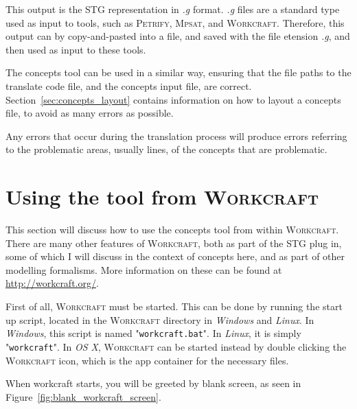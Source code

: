 \documentclass{proc}
\newcommand{\noun}[1]{\textsc{#1}}
\begin{document}
This output is the STG representation in \emph{.g} format. \emph{.g} files are a standard type used as input to tools, such as \noun{Petrify}, \noun{Mpsat}, and \noun{Workcraft}. 
Therefore, this output can by copy-and-pasted into a file, and saved with the file etension \emph{.g}, and then used as input to these tools. 

The concepts tool can be used in a similar way, ensuring that the file paths to the translate code file, and the concepts input file, are correct. Section~\ref{sec:concepts_layout} contains 
information on how to layout a concepts file, to avoid as many errors as possible. 

Any errors that occur during the translation process will produce errors referring to the problematic areas, usually lines, of the concepts that are problematic. 

\section{Using the tool from \noun{Workcraft} \label{sec:workcraft_usage}}

This section will discuss how to use the concepts tool from within \noun{Workcraft}. There are many other features of \noun{Workcraft}, both as part of the STG plug in, some of which I
 will discuss in the context of concepts here, and as part of other modelling formalisms. More information on these can be found at \url{http://workcraft.org/}.

First of all, \noun{Workcraft} must be started. This can be done by running the start up script, located in the \noun{Workcraft} directory in \emph{Windows} and \emph{Linux}. In 
\emph{Windows}, this script is named "\texttt{workcraft.bat}". In \emph{Linux}, it is simply "\texttt{workcraft}". In \emph{OS X}, \noun{Workcraft} can be started instead by double 
clicking the \noun{Workcraft} icon, which is the app container for the necessary files. 

When workcraft starts, you will be greeted by blank screen, as seen in Figure~\ref{fig:blank_workcraft_screen}.
\end{document}
